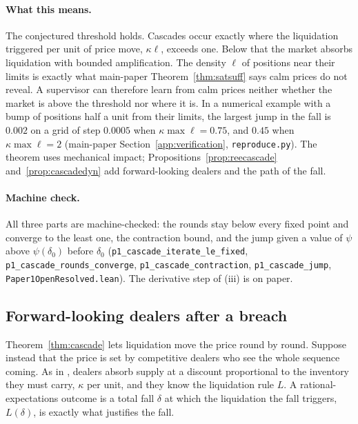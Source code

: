 \documentclass[12pt]{article}
\theoremstyle{definition}
\theoremstyle{remark}
\begin{document}
\paragraph{What this means.} The conjectured threshold holds. Cascades occur exactly where the liquidation triggered per unit of price move, $\kappa\ell$, exceeds one. Below that the market absorbs liquidation with bounded amplification. The density $\ell$ of positions near their limits is exactly what main-paper Theorem~\ref{thm:satsuff} says calm prices do not reveal. A supervisor can therefore learn from calm prices neither whether the market is above the threshold nor where it is. In a numerical example with a bump of positions half a unit from their limits, the largest jump in the fall is $0.002$ on a grid of step $0.0005$ when $\kappa\max\ell=0.75$, and $0.45$ when $\kappa\max\ell=2$ (main-paper Section~\ref{app:verification}, \nolinkurl{reproduce.py}). The theorem uses mechanical impact; Propositions~\ref{prop:reecascade} and~\ref{prop:cascadedyn} add forward-looking dealers and the path of the fall.

\paragraph{Machine check.} All three parts are machine-checked: the rounds stay below every fixed point and converge to the least one, the contraction bound, and the jump given a value of $\psi$ above $\psi(\delta_0)$ before $\delta_0$ (\texttt{p1\_cascade\_iterate\_le\_fixed}, \texttt{p1\_cascade\_rounds\_converge}, \texttt{p1\_cascade\_contraction}, \texttt{p1\_cascade\_jump}, \nolinkurl{Paper1OpenResolved.lean}). The derivative step of (iii) is on paper.

\subsection{Forward-looking dealers after a breach}

Theorem~\ref{thm:cascade} lets liquidation move the price round by round. Suppose instead that the price is set by competitive dealers who see the whole sequence coming. As in \citet{grossman1988}, dealers absorb supply at a discount proportional to the inventory they must carry, $\kappa$ per unit, and they know the liquidation rule $L$. A rational-expectations outcome is a total fall $\delta$ at which the liquidation the fall triggers, $L(\delta)$, is exactly what justifies the fall.
\end{document}
